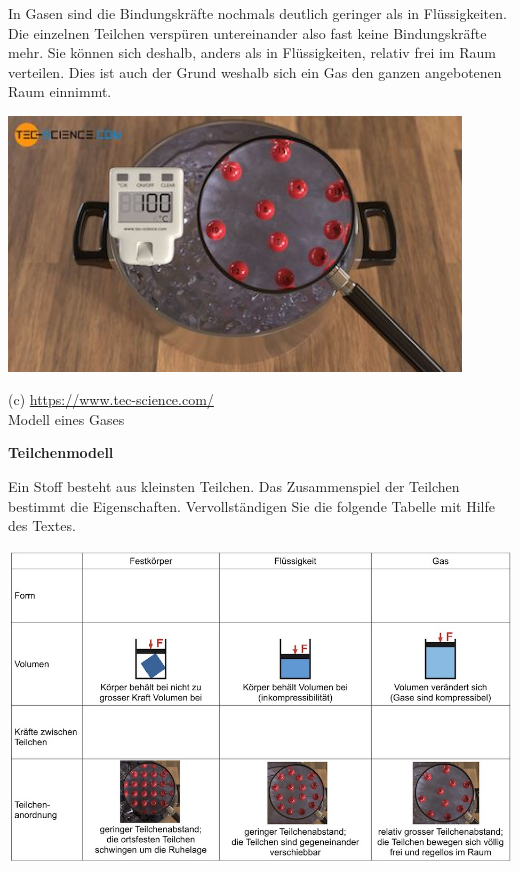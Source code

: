 \documentclass[11pt]{article}
\begin{document}
\begin{minipage}{0.65\textwidth}

In Gasen sind die Bindungskräfte  nochmals deutlich geringer als in Flüssigkeiten. Die einzelnen Teilchen verspüren untereinander also fast keine Bindungskräfte mehr. Sie können sich deshalb, anders als in Flüssigkeiten, relativ frei im Raum verteilen. Dies ist auch der Grund weshalb sich ein Gas den ganzen angebotenen Raum einnimmt.
\vspace{2cm}
\end{minipage}
\begin{minipage}{0.32\textwidth}
    \begin{flushright}
        \includegraphics[trim=6.5cm 2.5cm 3.5cm 0.5cm, clip,width=0.9\textwidth]{images/aggregatzustand-gasfoermig.jpg}
    \end{flushright}
    {\scriptsize (c) \url{https://www.tec-science.com/}} \\
    {\scriptsize Modell eines Gases}

\end{minipage}

\newpage
\textbf{\Large Teilchenmodell}

Ein Stoff besteht aus kleinsten Teilchen. Das Zusammenspiel der Teilchen bestimmt die Eigenschaften. Vervollständigen Sie die folgende Tabelle mit Hilfe des Textes.

\begin{center}
    \includegraphics[width=\textwidth]{images/Tabelle.jpg}
\end{center}
\end{document}
